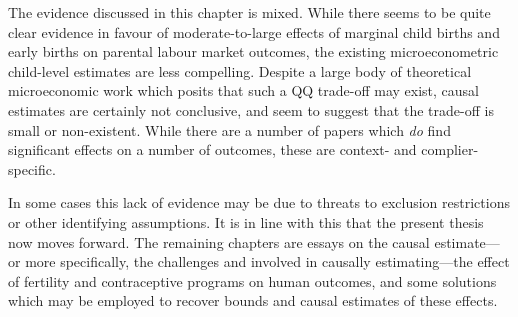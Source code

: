 The evidence discussed in this chapter is mixed.  While there seems to be 
quite clear evidence in favour of moderate-to-large effects of marginal child 
births and early births on parental labour market outcomes, the existing 
microeconometric child-level estimates are less compelling.  Despite a large
body of theoretical microeconomic work which posits that such a QQ trade-off 
may exist, causal estimates are certainly not conclusive, and seem to suggest 
that the trade-off is small or non-existent.  While there are a number of 
papers which \emph{do} find significant effects on a number of outcomes, these 
are context- and complier-specific.

In some cases this lack of evidence may be due to threats to exclusion 
restrictions or other identifying assumptions. It is in line with this that 
the present thesis now moves forward.  The remaining chapters are essays on the 
causal estimate---or more specifically, the challenges and involved in causally 
estimating---the effect of fertility and contraceptive programs on human 
outcomes, and some solutions which may be employed to recover bounds and causal
estimates of these effects.





